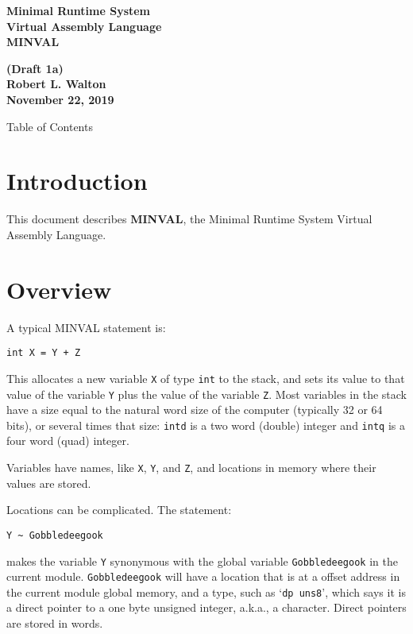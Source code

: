 \documentclass[12pt]{article}
\makeatletter
\renewcommand\tableofcontents{%
    \begin{list}{}%
	     {\setlength{\itemsep}{0in}%
	      \setlength{\topsep}{0in}%
	      \setlength{\parsep}{1ex}%
	      \setlength{\labelwidth}{0in}%
	      \setlength{\baselineskip}{1.5ex}%
	      \setlength{\leftmargin}{0.8in}%
	      \setlength{\rightmargin}{0.8in}}%
    \item\@starttoc{toc}%
    \end{list}}
\newcommand{\TILDE}{\textasciitilde}
\newcommand{\key}[1]{{\rm \bfseries #1}}
\makeatother
\begin{document}
        
\begin{center}
\Large \bf
Minimal Runtime System\\
Virtual Assembly Language\\[0.5ex]
\huge \bf
MINVAL
\end{center}
\begin{center}
\large \bf
(Draft 1a)
\\[0.5ex]
Robert L. Walton\\
November 22, 2019

\bigskip
 
Table of Contents
\end{center}

\bigskip

\tableofcontents 

\newpage

\section{Introduction}

This document describes \key{MINVAL}, the Minimal Runtime System Virtual
Assembly Language.

\section{Overview}

A typical MINVAL statement is:
\begin{center}
\tt int X = Y + Z
\end{center}
This allocates a new variable {\tt X} of type {\tt int}
to the stack, and sets its value to that value of the
variable {\tt Y} plus the value of the variable {\tt Z}.
Most variables in the stack have a size equal to the natural
word size of the computer (typically 32 or 64 bits), or
several times that size: {\tt intd} is a two word (double) integer
and {\tt intq} is a four word (quad) integer.

Variables have names, like {\tt X}, {\tt Y}, and {\tt Z},
and locations in memory where their values are stored.

Locations can be complicated.  The statement:
\begin{center}
\tt Y \TILDE{} Gobbledeegook
\end{center}
makes the variable {\tt Y} synonymous with the
global variable {\tt Gobbledeegook} in the current
module.  {\tt Gobbledeegook} will have a location that
is at a offset address in the current module global memory, and
a type, such as `{\tt dp uns8}', which says it is a
direct pointer to a one byte unsigned integer, a.k.a., a character.
Direct pointers are stored in words.
\end{document}
